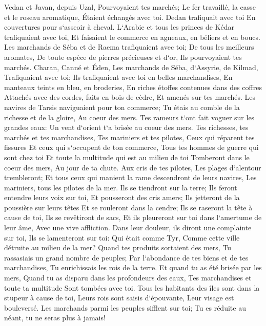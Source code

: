 \verse Vedan et Javan, depuis Uzal, Pourvoyaient tes marchés; Le fer travaillé, la casse et le roseau aromatique, Étaient échangés avec toi. 
\verse Dedan trafiquait avec toi En couvertures pour s`asseoir à cheval. 
\verse L`Arabie et tous les princes de Kédar trafiquaient avec toi, Et faisaient le commerce en agneaux, en béliers et en boucs. 
\verse Les marchands de Séba et de Raema trafiquaient avec toi; De tous les meilleurs aromates, De toute espèce de pierres précieuses et d`or, Ils pourvoyaient tes marchés. 
\verse Charan, Canné et Éden, Les marchands de Séba, d`Assyrie, de Kilmad, Trafiquaient avec toi; 
\verse Ils trafiquaient avec toi en belles marchandises, En manteaux teints en bleu, en broderies, En riches étoffes contenues dans des coffres Attachés avec des cordes, faits en bois de cèdre, Et amenés sur tes marchés. 
\verse Les navires de Tarsis naviguaient pour ton commerce; Tu étais au comble de la richesse et de la gloire, Au coeur des mers. 
\verse Tes rameurs t`ont fait voguer sur les grandes eaux: Un vent d`orient t`a brisée au coeur des mers. 
\verse Tes richesses, tes marchés et tes marchandises, Tes mariniers et tes pilotes, Ceux qui réparent tes fissures Et ceux qui s`occupent de ton commerce, Tous tes hommes de guerre qui sont chez toi Et toute la multitude qui est au milieu de toi Tomberont dans le coeur des mers, Au jour de ta chute. 
\verse Aux cris de tes pilotes, Les plages d`alentour trembleront; 
\verse Et tous ceux qui manient la rame descendront de leurs navires, Les mariniers, tous les pilotes de la mer. Ils se tiendront sur la terre; 
\verse Ils feront entendre leurs voix sur toi, Et pousseront des cris amers; Ils jetteront de la poussière sur leurs têtes Et se rouleront dans la cendre; 
\verse Ils se raseront la tête à cause de toi, Ils se revêtiront de sacs, Et ils pleureront sur toi dans l`amertume de leur âme, Avec une vive affliction. 
\verse Dans leur douleur, ils diront une complainte sur toi, Ils se lamenteront sur toi: Qui était comme Tyr, Comme cette ville détruite au milieu de la mer? 
\verse Quand tes produits sortaient des mers, Tu rassasiais un grand nombre de peuples; Par l`abondance de tes biens et de tes marchandises, Tu enrichissais les rois de la terre. 
\verse Et quand tu as été brisée par les mers, Quand tu as disparu dans les profondeurs des eaux, Tes marchandises et toute ta multitude Sont tombées avec toi. 
\verse Tous les habitants des îles sont dans la stupeur à cause de toi, Leurs rois sont saisis d`épouvante, Leur visage est bouleversé. 
\verse Les marchands parmi les peuples sifflent sur toi; Tu es réduite au néant, tu ne seras plus à jamais! 

